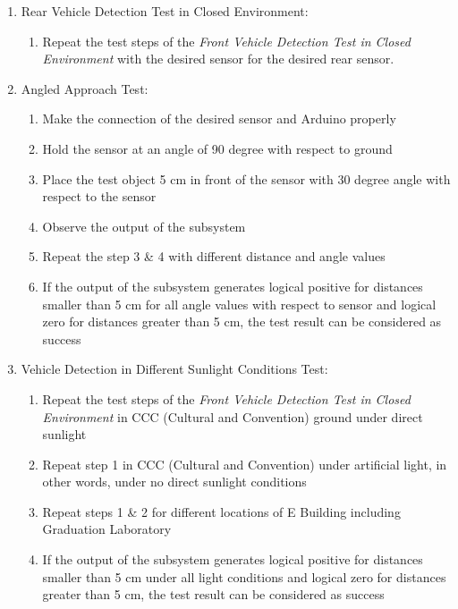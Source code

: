 \documentclass[a4paper,12pt]{article}
\begin{document}
\begin{enumerate}
\begin{enumerate}
		\item Rear Vehicle Detection Test in Closed Environment:		
			\begin{enumerate}
				\item Repeat the test steps of the \textit{Front Vehicle Detection Test in Closed Environment} with the desired sensor for the desired rear sensor.   
			\end{enumerate}
		
		\item {Angled Approach Test:}
			\begin{enumerate}
				\item Make the connection of the desired sensor and Arduino properly  
				\item Hold the sensor at an angle of 90 degree with respect to ground  
				\item Place the test object 5 cm in front of the sensor with 30 degree angle with respect to the sensor  
				\item Observe the output of the subsystem  
				\item Repeat the step 3 \& 4 with different distance and angle values  
				\item If the output of the subsystem generates logical positive for distances smaller than 5 cm for all angle values with respect to sensor and logical zero for distances greater than 5 cm, the test result can be considered as success  
			\end{enumerate}
		
		\item Vehicle Detection in Different Sunlight Conditions Test:
			\begin{enumerate}
				\item Repeat the test steps of the \textit{Front Vehicle Detection Test in Closed Environment} in CCC (Cultural and Convention) ground under direct sunlight  
				\item Repeat step 1 in CCC (Cultural and Convention) under artificial light, in other words, under no direct sunlight conditions  
				\item Repeat steps 1 \& 2 for different locations of E Building including Graduation Laboratory  
				\item If the output of the subsystem generates logical positive for distances smaller than 5 cm under all light conditions and logical zero for distances greater than 5 cm, the test result can be considered as success  
			\end{enumerate}
			

\end{enumerate}
\end{enumerate}
\end{document}
